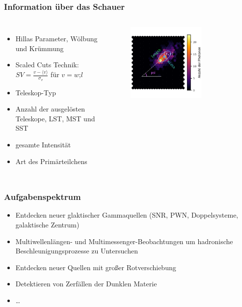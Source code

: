 \documentclass[aspectratio=1610, professionalfonts, 9pt]{beamer}
\begin{document}
  \begin{frame}
    \frametitle{Information über das Schauer}
    \begin{columns}
        \begin{itemize}
          \item Hillas Parameter, Wölbung und Krümmung
          \item Scaled Cuts Technik: $SV = \frac{v- \langle v \rangle}{\sigma_v}$ für $v=w\text{;}l$~\cite[104]{SV}
          \item Teleskop-Typ
          \item Anzahl der ausgelösten Teleskope, LST, MST und SST
          \item gesamte Intensität
          \item Art des Primärteilchens
        \end{itemize}
        \begin{figure}
          \includegraphics[width=0.7\textwidth]{pictures/hillas_2.pdf}
          \caption{\cite{Hillas}}
          \label{abb:Hillas}
        \end{figure}
    \end{columns}
  \end{frame}

  \begin{frame}
    \frametitle{Aufgabenspektrum}
    \begin{itemize}
      \item Entdecken neuer glaktischer Gammaquellen (SNR, PWN, Doppelsysteme, galaktische Zentrum)
      \item Multiwellenlängen- und Multimessenger-Beobachtungen um hadronische Beschleunigungsprozesse zu Untersuchen
      \item Entdecken neuer Quellen mit großer Rotverschiebung
      \item Detektieren von Zerfällen der Dunklen Materie
      \item \dots
    \end{itemize}
  \end{frame}
\end{document}
